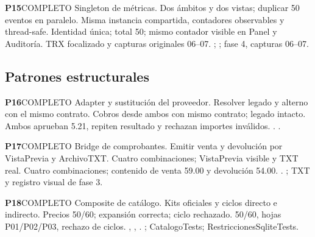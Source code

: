 \par\medskip\noindent\begin{minipage}{\linewidth}
\noindent\textbf{\large P15}\quad\textsf{COMPLETO}
 Singleton de métricas.
 Dos ámbitos y dos vistas; duplicar 50 eventos en paralelo.
 Misma instancia compartida, contadores observables y thread-safe.
 Identidad única; total 50; mismo contador visible en Panel y Auditoría.
 TRX focalizado y capturas originales 06–07. ; ; fase 4, capturas 06–07.
\end{minipage}\par
\subsection*{Patrones estructurales}
\par\medskip\noindent\begin{minipage}{\linewidth}
\noindent\textbf{\large P16}\quad\textsf{COMPLETO}
 Adapter y sustitución del proveedor.
 Resolver legado y alterno con el mismo contrato.
 Cobros desde ambos con mismo contrato; legado intacto.
 Ambos aprueban 5.21, repiten resultado y rechazan importes inválidos.
 . .
\end{minipage}\par
\par\medskip\noindent\begin{minipage}{\linewidth}
\noindent\textbf{\large P17}\quad\textsf{COMPLETO}
 Bridge de comprobantes.
 Emitir venta y devolución por VistaPrevia y ArchivoTXT.
 Cuatro combinaciones; VistaPrevia visible y TXT real.
 Cuatro combinaciones; contenido de venta 59.00 y devolución 54.00.
 . ; TXT y registro visual de fase 3.
\end{minipage}\par
\par\medskip\noindent\begin{minipage}{\linewidth}
\noindent\textbf{\large P18}\quad\textsf{COMPLETO}
 Composite de catálogo.
 Kits oficiales y ciclos directo e indirecto.
 Precios 50/60; expansión correcta; ciclo rechazado.
 50/60, hojas P01/P02/P03, rechazo de ciclos.
 , , . ; CatalogoTests; RestriccionesSqliteTests.
\end{minipage}\par
